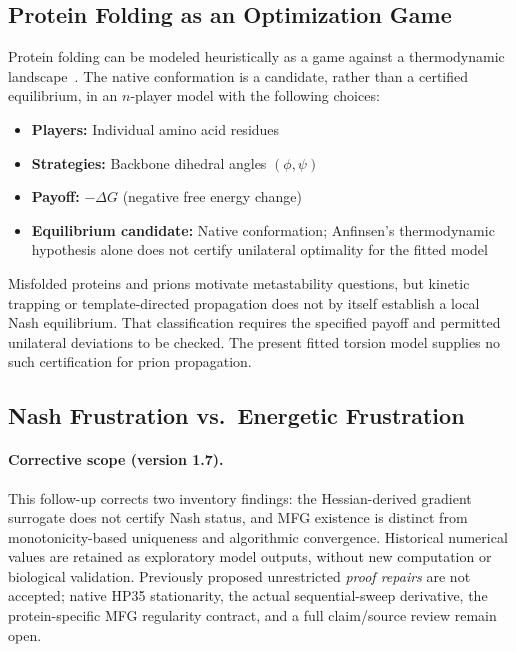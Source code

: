 \documentclass[12pt,a4paper]{article}
\theoremstyle{remark}
\begin{document}
\subsection{Protein Folding as an Optimization Game}

Protein folding can be modeled heuristically as a game against a thermodynamic landscape~\citep{EnzymeFolding}. The native conformation is a candidate, rather than a certified equilibrium, in an $n$-player model with the following choices:

\begin{itemize}
    \item \textbf{Players:} Individual amino acid residues
    \item \textbf{Strategies:} Backbone dihedral angles $(\phi, \psi)$
    \item \textbf{Payoff:} $-\Delta G$ (negative free energy change)
    \item \textbf{Equilibrium candidate:} Native conformation; Anfinsen's thermodynamic hypothesis alone does not certify unilateral optimality for the fitted model~\citep{Anfinsen1973}
\end{itemize}

Misfolded proteins and prions motivate metastability questions, but kinetic trapping or template-directed propagation does not by itself establish a local Nash equilibrium. That classification requires the specified payoff and permitted unilateral deviations to be checked. The present fitted torsion model supplies no such certification for prion propagation.

\subsection{Nash Frustration vs.\ Energetic Frustration}

\paragraph{Corrective scope (version 1.7).}
This follow-up corrects two inventory findings: the Hessian-derived gradient surrogate does not certify Nash status, and MFG existence is distinct from monotonicity-based uniqueness and algorithmic convergence. Historical numerical values are retained as exploratory model outputs, without new computation or biological validation. Previously proposed unrestricted \emph{proof repairs} are not accepted; native HP35 stationarity, the actual sequential-sweep derivative, the protein-specific MFG regularity contract, and a full claim/source review remain open.
\end{document}
